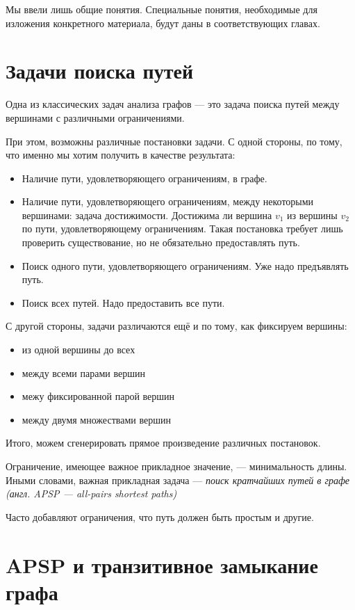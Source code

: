 Мы ввели лишь общие понятия.
Специальные понятия, необходимые для изложения конкретного материала, будут даны в соответствующих главах.

\section{Задачи поиска путей}

Одна из классических задач анализа графов --- это задача поиска путей между вершинами с различными ограничениями.

При этом, возможны различные постановки задачи.
С одной стороны, по тому, что именно мы хотим получить в качестве результата:
\begin{itemize}
\item Наличие пути, удовлетворяющего ограничениям, в графе.
\item Наличие пути, удовлетворяющего ограничениям, между некоторыми вершинами: задача достижимости.
      Достижима ли вершина $v_1$ из вершины $v_2$ по пути, удовлетворяющему ограничениям.
      Такая постановка требует лишь проверить существование, но не обязательно предоставлять путь.
\item Поиск одного пути, удовлетворяющего ограничениям. Уже надо предъявлять путь.
\item Поиск всех путей. Надо предоставить все пути.
\end{itemize}

С другой стороны, задачи различаются ещё и по тому, как фиксируем вершины:
\begin{itemize}
\item из одной вершины до всех
\item между всеми парами вершин
\item межу фиксированной парой вершин
\item между двумя множествами вершин
\end{itemize}

Итого, можем сгенерировать прямое произведение различных постановок.

Ограничение, имеющее важное прикладное значение, --- минимальность длины.
Иными словами, важная прикладная задача --- \textit{поиск кратчайших путей в графе (англ. APSP --- all-pairs shortest paths)}

Часто добавляют ограничения, что путь должен быть простым и другие.

\section{APSP и транзитивное замыкание графа}

